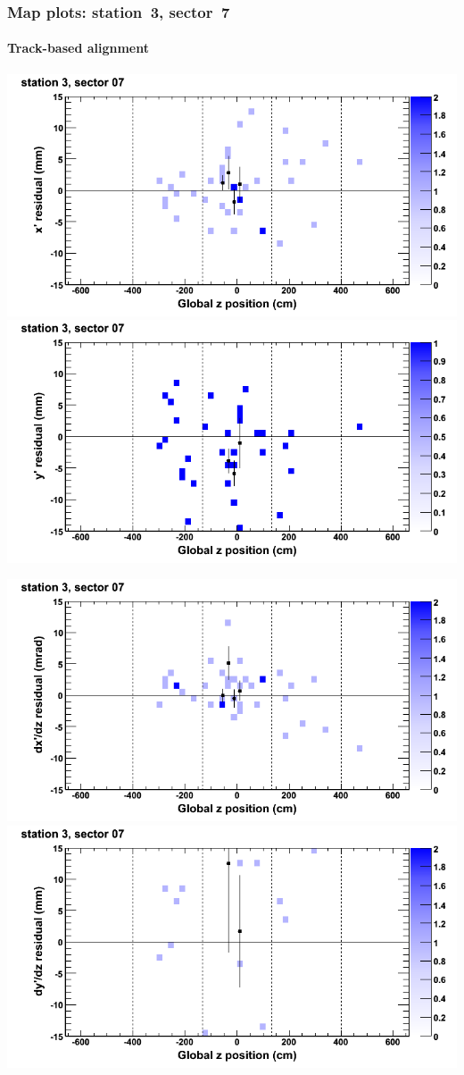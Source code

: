 \documentclass[compress]{beamer}
\begin{document}
\begin{frame}
\frametitle{Map plots: station~3, sector~7}
\framesubtitle{Track-based alignment}
\includegraphics[width=0.5\linewidth]{mapplots_re05/DTvsz_st3sec07_x.png}
\includegraphics[width=0.5\linewidth]{mapplots_re05/DTvsz_st3sec07_y.png}

\includegraphics[width=0.5\linewidth]{mapplots_re05/DTvsz_st3sec07_dxdz.png}
\includegraphics[width=0.5\linewidth]{mapplots_re05/DTvsz_st3sec07_dydz.png}
\end{frame}
\end{document}
